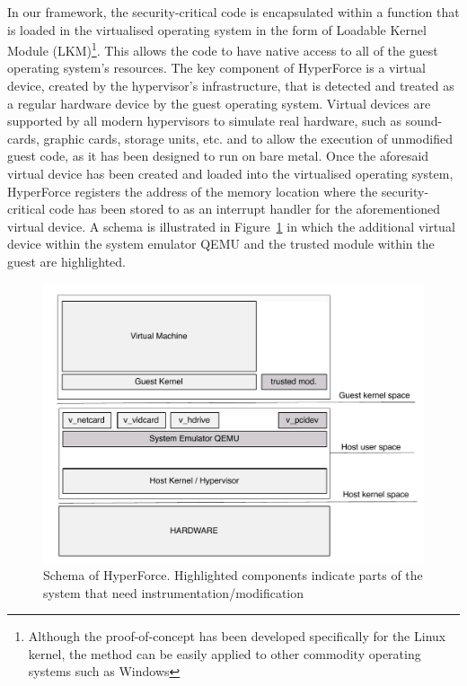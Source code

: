 In our framework, the security-critical code is encapsulated within a function that is loaded in the virtualised operating system in the form of Loadable Kernel Module (LKM)\footnote{Although the proof-of-concept has been developed specifically for the Linux kernel, the method can be easily applied to other commodity operating systems such as Windows}. This allows the code to have native access to all of the guest operating system's resources.
The key component of HyperForce is a virtual device, created by the hypervisor's infrastructure, that is detected and treated as a regular hardware device by the guest operating system.  
Virtual devices are supported by all modern hypervisors to simulate real hardware, such as sound-cards, graphic cards, storage units, etc. and to allow the execution of unmodified guest code, as it has been designed to run on bare metal. 
Once the aforesaid virtual device has been created and loaded into the virtualised operating system, HyperForce registers the address of the memory location where the security-critical code has been stored to as an interrupt handler for the aforementioned virtual device. A schema is illustrated in Figure~\ref{hyperforce_schema} in which the additional virtual device within the system emulator QEMU \cite{qemu} and the trusted module within the guest are highlighted. 

\begin{figure} 
\begin{center}
\includegraphics[scale=0.5]{images/hyperforce_schema.pdf}
\caption{Schema of HyperForce. Highlighted components indicate parts of the system that need instrumentation/modification}
\label{hyperforce_schema}
\end{center}
\end{figure}

